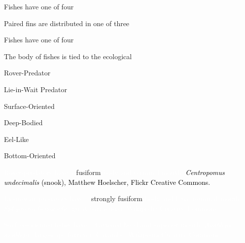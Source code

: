 \documentclass[t,handout]{beamer}  %
\begin{document}
{
\begin{frame}[b,plain]{Fishes have one of four }
\end{frame}
}

{
\begin{frame}[b,plain]{Paired fins are distributed in one of three }
\end{frame}
}

{
\begin{frame}[b,plain]{Fishes have one of four }
\end{frame}
}

\begin{frame}[t,plain]{The body  of fishes is tied to the ecological }

\hangpara Rover-Predator

\hangpara Lie-in-Wait Predator

\hangpara Surface-Oriented

\hangpara Deep-Bodied

\hangpara Eel-Like

\hangpara Bottom-Oriented

\end{frame}

{
\begin{frame}[b,plain]{\textcolor{white}{Rover-predators have a} \textcolor{orange6}{fusiform} \textcolor{white}{body and terminal mouth.}}
\hfill\tiny\textcolor{black}{\textit{Centropomus undecimalis} (snook), Matthew Hoelscher, Flickr Creative Commons.}
\end{frame}
}

{
\begin{frame}[b,plain]{\textcolor{white}{Lie-in-wait predators have a} \textcolor{orange6}{strongly fusiform} \textcolor{white}{body and large terminal mouth.}}
\hfill\tiny\textcolor{white}{\textit{Sphyraena barracuda} (great barracuda), Wikipedia Creative Commons.}
\end{frame}
}

{
\begin{frame}[b,plain]{\textcolor{white}{Surface-oriented fishes have a flattened head and superior mouth.}}
\hfill\tiny\textcolor{white}{\textit{Anableps anableps} (largescape foureye), Cayambe, Wikipedia Creative Commons.}
\end{frame}
}
\end{document}
